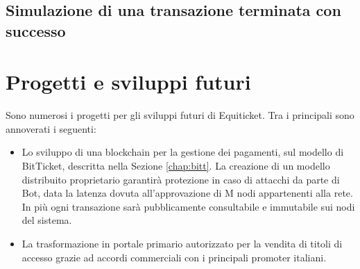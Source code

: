 \subsection{Simulazione di una transazione terminata con successo}
\section{Progetti e sviluppi futuri}
Sono numerosi i progetti per gli sviluppi futuri di Equiticket. Tra i principali sono annoverati i seguenti: 
\begin{itemize}
\item Lo sviluppo di una blockchain per la gestione dei pagamenti, sul modello di BitTicket, descritta nella Sezione \ref{chap:bitt}. La creazione di un modello distribuito proprietario garantirà protezione in caso di attacchi da parte di Bot, data la latenza dovuta all'approvazione di M nodi appartenenti alla rete. In più ogni transazione sarà pubblicamente consultabile e immutabile sui nodi del sistema. 
\item La trasformazione in portale primario autorizzato per la vendita di titoli di accesso grazie ad accordi commerciali con i principali promoter italiani. 
\end{itemize}